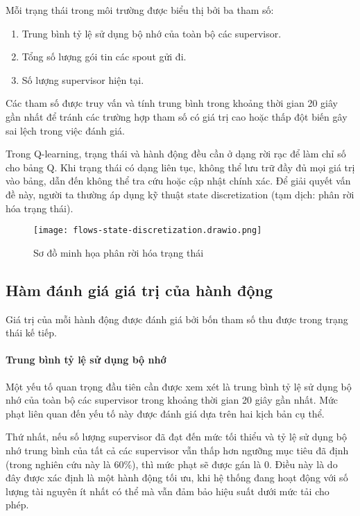 Mỗi trạng thái trong môi trường được biểu thị bởi ba tham số:

\begin{enumerate}
    \item Trung bình tỷ lệ sử dụng bộ nhớ của toàn bộ các supervisor.
    \item Tổng số lượng gói tin các spout gửi đi.
    \item Số lượng supervisor hiện tại.
\end{enumerate}

Các tham số được truy vấn và tính trung bình trong khoảng thời gian 20 giây gần nhất để tránh các trường hợp tham số có giá trị cao hoặc thấp đột biến gây sai lệch trong việc đánh giá.

Trong Q-learning, trạng thái và hành động đều cần ở dạng rời rạc để làm chỉ số cho bảng Q. Khi trạng thái có dạng liên tục, không thể lưu trữ đầy đủ mọi giá trị vào bảng, dẫn đến không thể tra cứu hoặc cập nhật chính xác. Để giải quyết vấn đề này, người ta thường áp dụng kỹ thuật state discretization (tạm dịch: phân rời hóa trạng thái).

\begin{figure}[htbp]
    \centering
    \texttt{[image: flows-state-discretization.drawio.png]}
    \caption{Sơ đồ minh họa phân rời hóa trạng thái}
\end{figure}

\subsection{Hàm đánh giá giá trị của hành động}

Giá trị của mỗi hành động được đánh giá bởi bốn tham số thu được trong trạng thái kế tiếp.

\paragraph{Trung bình tỷ lệ sử dụng bộ nhớ}

Một yếu tố quan trọng đầu tiên cần được xem xét là trung bình tỷ lệ sử dụng bộ nhớ của toàn bộ các supervisor trong khoảng thời gian 20 giây gần nhất. Mức phạt liên quan đến yếu tố này được đánh giá dựa trên hai kịch bản cụ thể.

Thứ nhất, nếu số lượng supervisor đã đạt đến mức tối thiểu và tỷ lệ sử dụng bộ nhớ trung bình của tất cả các supervisor vẫn thấp hơn ngưỡng mục tiêu đã định (trong nghiên cứu này là 60\%), thì mức phạt sẽ được gán là 0. Điều này là do đây được xác định là một hành động tối ưu, khi hệ thống đang hoạt động với số lượng tài nguyên ít nhất có thể mà vẫn đảm bảo hiệu suất dưới mức tải cho phép.

